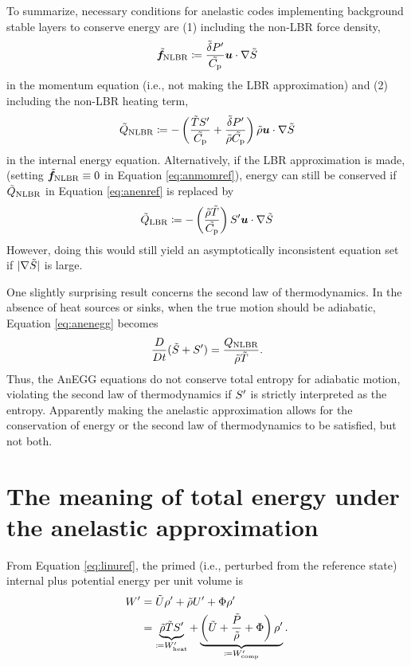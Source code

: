 \documentclass[12pt]{article}
\newcommand{\wpheat}{W^\prime_{\rm heat}}
\newcommand{\wpcomp}{W^\prime_{\rm comp}}
\begin{document}
To summarize, necessary conditions for anelastic codes implementing background stable layers to conserve energy are (1) including the non-LBR force density,
\begin{align}\label{eq:nlbrmomref}
	\tilde{\bm{f}}_{\rm NLBR} \coloneqq\frac{\tilde{\delta}  P^\prime}{\tilde{C_{\rm{p}}}} \bm{u}\cdot \nabla\tilde{S} 
\end{align}
in the momentum equation (i.e., not making the LBR approximation) and (2) including the non-LBR heating term,
\begin{align}\label{eq:nlbrheatref}
	\tilde{Q}_{\rm NLBR} \coloneqq -  \left(\frac{\tilde{T} S^\prime}{\tilde{C_{\rm{p}}}} + \frac{\tilde{\delta}  P^\prime}{\tilde{\rho}\tilde{C_{\rm{p}}}}\right)  \tilde{\rho} \bm{u}\cdot\nabla\tilde{S}
\end{align}
in the internal energy equation. Alternatively, if the LBR approximation is made, (setting $\tilde{\bm{f}}_{\rm NLBR}\equiv0$ in Equation \eqref{eq:anmomref}), energy can still be conserved if $\tilde{Q}_{\rm NLBR}$ in Equation \eqref{eq:anenref} is replaced by
\begin{align}\label{eq:lbrheating}
	\tilde{Q}_{\rm LBR}\coloneqq - \left(\frac{\tilde{\rho}\tilde{T}}{\tilde{C_{\rm{p}}}} \right) S^\prime\bm{u}\cdot\nabla\tilde{S}
\end{align}
However, doing this would still yield an asymptotically inconsistent equation set if $|\nabla\tilde{S}|$ is large. 

One slightly surprising result concerns the second law of thermodynamics. In the absence of heat sources or sinks, when the true motion should be adiabatic, Equation \eqref{eq:anenegg} becomes
\begin{align}\label{eq:dsdtref}
	\frac{D}{Dt}(\tilde{S} + S^\prime) = \frac{Q_{\rm NLBR}}{\tilde{\rho}\tilde{T}}.
\end{align}
Thus, the AnEGG equations do not conserve total entropy for adiabatic motion, violating the second law of thermodynamics if $S^\prime$ is strictly interpreted as the entropy. Apparently making the anelastic approximation allows for the conservation of energy or the second law of thermodynamics to be satisfied, but not both. 

\section{The meaning of total energy under the anelastic approximation}\label{sec:meaningtote}
From Equation \eqref{eq:linuref}, the primed (i.e., perturbed from the reference state) internal plus potential energy per unit volume is 
\begin{align}\label{eq:perten1}
	W^\prime &= \tilde{U}\rhoprime + \rhotilde U^\prime + \Phi \rhoprime \nonumber\\
	&= \underbrace{\rhotilde\tilde{T} \entrprime}_{\define \wpheat} + \underbrace{\left(\tilde{U}+\frac{\tilde{P}}{\rhotilde}+\Phi\right)\rhoprime}_{\define\wpcomp}.
\end{align}
\end{document}
